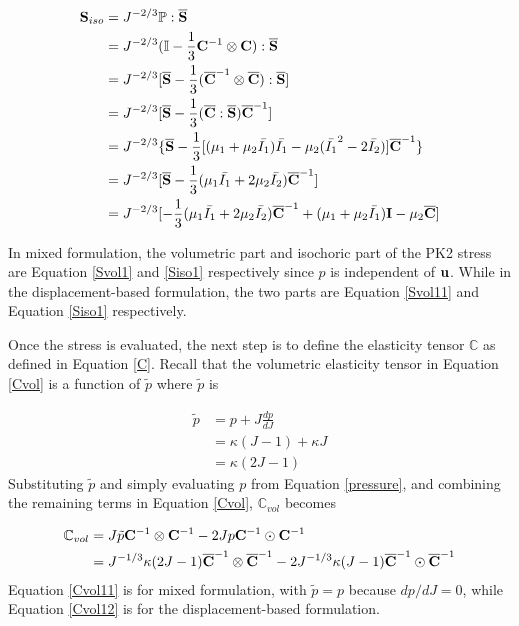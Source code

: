 \begin{equation} \label{Siso1}
\begin{split}
\bold{S}_{iso}
&= J^{-2/3}\mathbb{P}:\overline{\bold{S}} \\
&= J^{-2/3}( \mathbb{I} - \frac{1}{3}\bold{C}^{-1} \otimes \bold{C} ) : \overline{\bold{S}} \\
&= J^{-2/3} [\overline{\bold{S}} - \frac{1}{3}( \overline{\bold{C}}^{-1} \otimes \overline{\bold{C}} ) : \overline{\bold{S}} ]  \\
&= J^{-2/3}[ \overline{\bold{S}} - \frac{1}{3}(\overline{\bold{C}} : \overline{\bold{S}})\overline{\bold{C}}^{-1} ]  \\
&= J^{-2/3}\{ \overline{\bold{S}} - \frac{1}{3} [(\mu_1+\mu_2\bar{I_1})\bar{I_1} - \mu_2(\bar{I_1}^2-2\bar{I_2})]\overline{\bold{C}}^{-1} \} \\
&= J^{-2/3}[\overline{\bold{S}} -  \frac{1}{3}(\mu_1\bar{I_1} + 2\mu_2\bar{I_2}) \overline{\bold{C}}^{-1}] \\
&= J^{-2/3} [    - \frac{1}{3}(\mu_1\bar{I_1} + 2\mu_2\bar{I_2}) \overline{\bold{C}}^{-1}  + (\mu_1 + \mu_2\bar{I_1})\bold{I} - \mu_2\overline{\bold{C}} ]
\end{split}
\end{equation}

In mixed formulation, the volumetric part and isochoric part of the PK2 stress are Equation \ref{Svol1} and \ref{Siso1} respectively since $p$ is independent of $\bold{u}$. While in the displacement-based formulation, the two parts are Equation \ref{Svol11} and Equation \ref{Siso1} respectively.

Once the stress is evaluated, the next step is to define the elasticity tensor $\mathbb{C}$ as defined in Equation \ref{C}. Recall that the volumetric elasticity tensor in Equation \ref{Cvol} is a function of $\tilde{p}$ where $\tilde{p}$ is

\begin{equation}
\begin{split}
\tilde{p} &= p + J\frac{dp}{dJ} \\
             &= \kappa(J-1) + \kappa{J} \\
             &= \kappa{(2J - 1)}
\end{split}
\end{equation}
Substituting $\tilde{p}$ and simply evaluating $p$ from Equation \ref{pressure}, and combining the remaining terms in Equation \ref{Cvol}, $\mathbb{C}_{vol}$ becomes

\begin{subequations} \label{Cvol1}
\begin{align}
\mathbb{C}_{vol} &= J\tilde{p}\bold{C}^{-1}\otimes\bold{C}^{-1} - 2Jp\bold{C}^{-1}\odot\bold{C}^{-1} \label{Cvol11} \\
&=  J^{-1/3}\kappa{(2J-1)} \overline{\bold{C}}^{-1} \otimes \overline{\bold{C}}^{-1} - 2J^{-1/3}\kappa{(J-1)} \overline{\bold{C}}^{-1} \odot \overline{\bold{C}}^{-1} \label{Cvol12}
\end{align}
\end{subequations} 
Equation \ref{Cvol11} is for mixed formulation, with $\tilde{p} = p$ because $dp/dJ = 0$, while Equation \ref{Cvol12} is for the displacement-based formulation.

